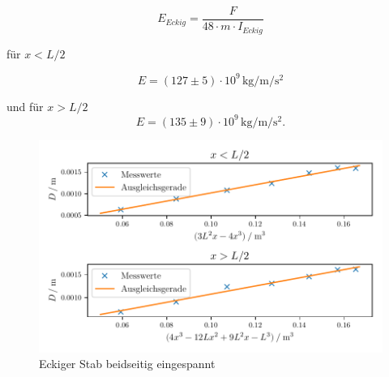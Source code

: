 \begin{equation}
  E_{Eckig}=\frac{F}{48 \cdot m \cdot I_{Eckig}}
\end{equation}

\noindent für $x<L/2$

\begin{equation*}
  E=(127 \pm 5) \cdot 10^9 \,\si{\kilo\gram\per\meter\per\second\squared}
\end{equation*}


\noindent und für $x>L/2$
\begin{equation*}
  E=(135 \pm 9) \cdot 10^9 \,\si{\kilo\gram\per\meter\per\second\squared}.
\end{equation*}



\begin{figure}[H]
  \centering
  \includegraphics{build/plot4.pdf}
  \caption{Eckiger Stab beidseitig eingespannt}
  \label{fig:d}
\end{figure}




